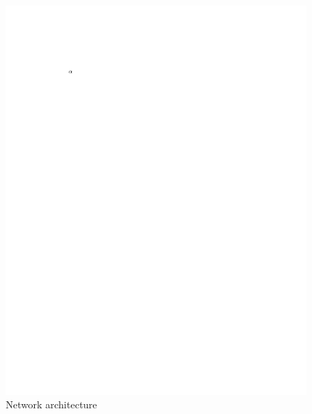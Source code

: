 \documentclass[a4paper,12pt,sort&compress]{article}
\begin{document}
    \begin{figure}
        \centering
        \includegraphics[width=0.6\linewidth]{a.pdf}
        \caption{Network architecture}
        \label{fig:network_architecture}
    \end{figure}
\end{document}
